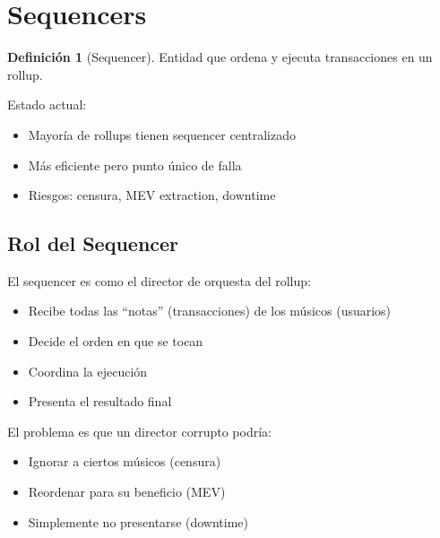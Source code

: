 \documentclass[11pt,a4paper,twoside,openright]{book}
\theoremstyle{definition}
\newtheorem{definition}{Definición}[chapter]
\theoremstyle{plain}
\theoremstyle{remark}
\begin{document}

\section{Sequencers}

\begin{definition}[Sequencer]
Entidad que ordena y ejecuta transacciones en un rollup.
\end{definition}

Estado actual:
\begin{itemize}
    \item Mayoría de rollups tienen sequencer centralizado
    \item Más eficiente pero punto único de falla
    \item Riesgos: censura, MEV extraction, downtime
\end{itemize}

\subsection{Rol del Sequencer}

\begin{intuicion}
El sequencer es como el director de orquesta del rollup:
\begin{itemize}
    \item Recibe todas las ``notas'' (transacciones) de los músicos (usuarios)
    \item Decide el orden en que se tocan
    \item Coordina la ejecución
    \item Presenta el resultado final
\end{itemize}

El problema es que un director corrupto podría:
\begin{itemize}
    \item Ignorar a ciertos músicos (censura)
    \item Reordenar para su beneficio (MEV)
    \item Simplemente no presentarse (downtime)
\end{itemize}
\end{intuicion}
\end{document}
